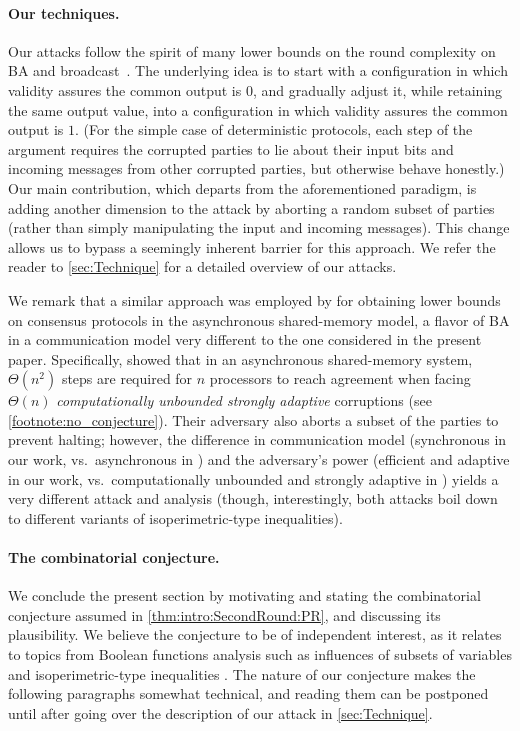 \paragraph{Our techniques.}
Our attacks follow the spirit of many lower bounds on the round complexity on BA and broadcast~\cite{FL82,DS83,KY86,DRS90,GKKO07,AH10}. The underlying idea is to start with a configuration in which validity assures the common output is $0$, and gradually adjust it, while retaining the same output value, into a configuration in which validity assures the common output is $1$. (For the simple case of deterministic protocols, each step of the argument requires the corrupted parties to lie about their input bits and incoming messages from other corrupted parties, but otherwise behave honestly.) Our main contribution, which departs from the aforementioned paradigm, is adding another dimension to the attack by aborting a random subset of parties (rather than simply manipulating the input and incoming messages). This change allows us to bypass a seemingly inherent barrier for this approach. We refer the reader to \cref{sec:Technique} for a detailed overview of our attacks.

We remark that a similar approach was employed by \citet{AC08} for obtaining lower bounds on consensus protocols in the asynchronous shared-memory model, a flavor of BA in a communication model very different to the one considered in the present paper. Specifically, \cite{AC08} showed that in an asynchronous shared-memory system, $\Theta(n^2)$ steps are required for $n$ processors to reach agreement when facing $\Theta(n)$ \emph{computationally unbounded strongly adaptive} corruptions (see \cref{footnote:no_conjecture}). Their adversary also aborts a subset of the parties to prevent halting; however, the difference in communication model (synchronous in our work, vs.\ asynchronous in \cite{AC08}) and the adversary's power (efficient and adaptive in our work, vs.\ computationally unbounded and strongly adaptive in \cite{AC08}) yields a very different attack and analysis (though, interestingly, both attacks boil down to different variants of isoperimetric-type inequalities).

\paragraph{The combinatorial conjecture.}
We conclude the present section by motivating and stating the combinatorial conjecture assumed in \cref{thm:intro:SecondRound:PR}, and discussing its plausibility. We believe the conjecture to be of independent interest, as it relates to topics from Boolean functions analysis such as influences of subsets of variables \cite{Odonnel14} and isoperimetric-type inequalities \cite{MosselORSS2006,MosselOS2013}. The nature of our conjecture makes the following paragraphs somewhat technical, and reading them can be postponed until after going over the description of our attack in \cref{sec:Technique}.

